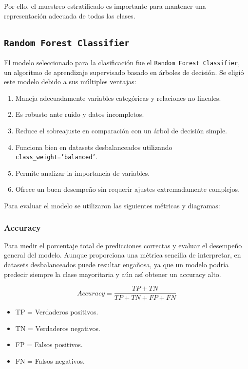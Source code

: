 Por ello, el muestreo estratificado es importante para mantener una representación adecuada de todas las clases.

\subsection{\texttt{Random Forest Classifier}}

El modelo seleccionado para la clasificación fue el \texttt{Random Forest Classifier}, un algoritmo de aprendizaje supervisado basado en árboles de decisión.
Se eligió este modelo debido a sus múltiples ventajas:

\begin{enumerate}
    \item Maneja adecuadamente variables categóricas y relaciones no lineales.
    \item Es robusto ante ruido y datos incompletos.
    \item Reduce el sobreajuste en comparación con un árbol de decisión simple.
    \item Funciona bien en datasets desbalanceados utilizando \texttt{class\_weight='balanced'}.
    \item Permite analizar la importancia de variables.
    \item Ofrece un buen desempeño sin requerir ajustes extremadamente complejos.
\end{enumerate}

Para evaluar el modelo se utilizaron las siguientes métricas y diagramas:

\subsubsection{Accuracy}

Para medir el porcentaje total de predicciones correctas y evaluar el desempeño general del modelo. Aunque proporciona una métrica
sencilla de interpretar, en datasets desbalanceados puede resultar engañosa, ya que un modelo podría predecir siempre la clase
mayoritaria y aún así obtener un accuracy alto.

\[Accuracy = \frac{TP + TN}{TP + TN + FP + FN}\]

\begin{itemize}
    \item TP = Verdaderos positivos.
    \item TN = Verdaderos negativos.
    \item FP = Falsos positivos.
    \item FN = Falsos negativos.
\end{itemize}

